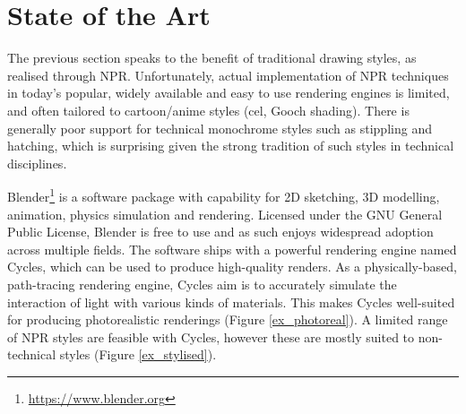 \section{State of the Art}

The previous section speaks to the benefit of traditional drawing styles, as realised through NPR. Unfortunately, actual implementation of NPR techniques in today's popular, widely available and easy to use rendering engines is limited, and often tailored to cartoon/anime styles (cel, Gooch shading).
There is generally poor support for technical monochrome styles such as stippling and hatching, which is surprising given the strong tradition of such styles in technical disciplines.

Blender\footnote{\url{https://www.blender.org}} is a software package with capability for 2D sketching, 3D modelling, animation, physics simulation and rendering.
Licensed under the GNU General Public License, Blender is free to use and as such enjoys widespread adoption across multiple fields.
The software ships with a powerful rendering engine named Cycles, which can be used to produce high-quality renders.
As a physically-based, path-tracing rendering engine, Cycles aim is to accurately simulate the interaction of light with various kinds of materials.
This makes Cycles well-suited for producing photorealistic renderings (Figure \ref{ex_photoreal}).
A limited range of NPR styles are feasible with Cycles, however these are mostly suited to non-technical styles (Figure \ref{ex_stylised}).

